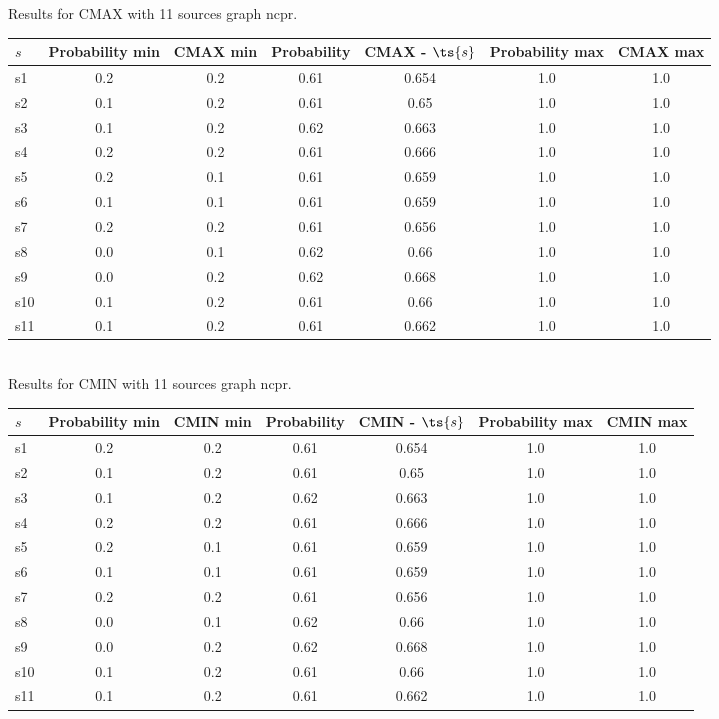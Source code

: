 \documentclass{article}
\begin{document}
\noindent Results for CMAX with 11 sources graph ncpr.

\noindent\begin{tabular}{|l|c|c|c|c|c|c|}
\hline
$s$& Probability min & CMAX min & Probability & CMAX - $\ts{s}$ & Probability max & CMAX max\\
\hline
s1 &0.2 & 0.2 & 0.61 & 0.654 & 1.0 & 1.0\\
\hline
s2 &0.1 & 0.2 & 0.61 & 0.65 & 1.0 & 1.0\\
\hline
s3 &0.1 & 0.2 & 0.62 & 0.663 & 1.0 & 1.0\\
\hline
s4 &0.2 & 0.2 & 0.61 & 0.666 & 1.0 & 1.0\\
\hline
s5 &0.2 & 0.1 & 0.61 & 0.659 & 1.0 & 1.0\\
\hline
s6 &0.1 & 0.1 & 0.61 & 0.659 & 1.0 & 1.0\\
\hline
s7 &0.2 & 0.2 & 0.61 & 0.656 & 1.0 & 1.0\\
\hline
s8 &0.0 & 0.1 & 0.62 & 0.66 & 1.0 & 1.0\\
\hline
s9 &0.0 & 0.2 & 0.62 & 0.668 & 1.0 & 1.0\\
\hline
s10 &0.1 & 0.2 & 0.61 & 0.66 & 1.0 & 1.0\\
\hline
s11 &0.1 & 0.2 & 0.61 & 0.662 & 1.0 & 1.0\\
\hline
\end{tabular}\\

\noindent Results for CMIN with 11 sources graph ncpr.

\noindent\begin{tabular}{|l|c|c|c|c|c|c|}
\hline
$s$& Probability min & CMIN min & Probability & CMIN - $\ts{s}$ & Probability max & CMIN max\\
\hline
s1 &0.2 & 0.2 & 0.61 & 0.654 & 1.0 & 1.0\\
\hline
s2 &0.1 & 0.2 & 0.61 & 0.65 & 1.0 & 1.0\\
\hline
s3 &0.1 & 0.2 & 0.62 & 0.663 & 1.0 & 1.0\\
\hline
s4 &0.2 & 0.2 & 0.61 & 0.666 & 1.0 & 1.0\\
\hline
s5 &0.2 & 0.1 & 0.61 & 0.659 & 1.0 & 1.0\\
\hline
s6 &0.1 & 0.1 & 0.61 & 0.659 & 1.0 & 1.0\\
\hline
s7 &0.2 & 0.2 & 0.61 & 0.656 & 1.0 & 1.0\\
\hline
s8 &0.0 & 0.1 & 0.62 & 0.66 & 1.0 & 1.0\\
\hline
s9 &0.0 & 0.2 & 0.62 & 0.668 & 1.0 & 1.0\\
\hline
s10 &0.1 & 0.2 & 0.61 & 0.66 & 1.0 & 1.0\\
\hline
s11 &0.1 & 0.2 & 0.61 & 0.662 & 1.0 & 1.0\\
\hline
\end{tabular}\\
\end{document}

